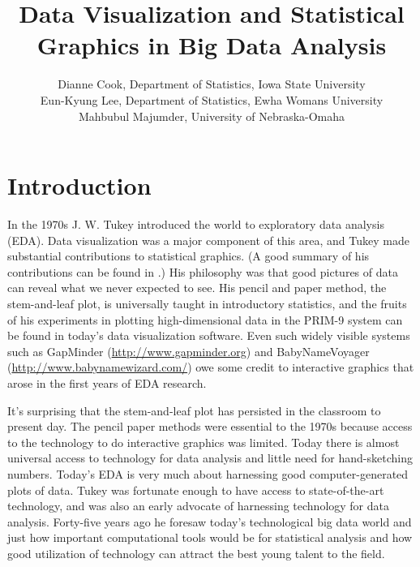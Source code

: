 \documentclass{article}
\begin{document}
\title{Data Visualization and Statistical Graphics in Big Data Analysis}%
\author{Dianne Cook, Department of Statistics, Iowa State University\\
Eun-Kyung Lee, Department of Statistics, Ewha Womans University\\
Mahbubul Majumder, University of Nebraska-Omaha}
\maketitle

\section{Introduction}

In the 1970s J. W. Tukey introduced the world to exploratory data analysis (EDA). Data visualization was a major component of this area, and Tukey made substantial contributions to statistical graphics. (A good summary of his contributions can be found in \citet{stuetzlefriedman2002}.) His philosophy was that good pictures of data can reveal what we never expected to see. His pencil and paper method, the stem-and-leaf plot, is universally taught in introductory statistics, and the fruits of his experiments in plotting high-dimensional data in the PRIM-9 system can be found in today's data visualization software. Even such widely visible systems such as GapMinder (\url{http://www.gapminder.org}) and BabyNameVoyager (\url{http://www.babynamewizard.com/}) owe some credit to interactive graphics that arose in the first years of EDA research.

It's surprising that the stem-and-leaf plot has persisted in the classroom to present day. The pencil paper methods were essential to the 1970s because access to the technology to do interactive graphics was limited. Today there is almost universal access to technology for data analysis and little need for hand-sketching numbers. Today's EDA is very much about harnessing good computer-generated plots of data. Tukey was fortunate enough to have access to state-of-the-art technology, and was also an early advocate of harnessing technology for data analysis. Forty-five years ago he foresaw today's technological big data world and just how important computational tools would be for statistical analysis and how good utilization of technology can attract the best young talent to the field.
\end{document}
